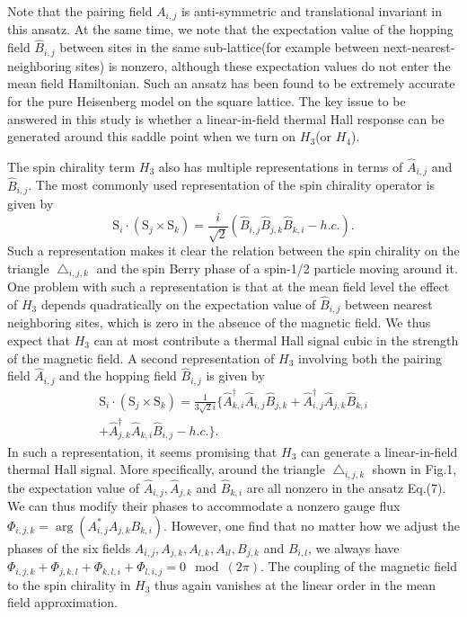 \documentclass[prb,twocolumn,showpacs]{revtex4}
\begin{document}
Note that the pairing field $A_{i,j}$ is anti-symmetric and translational invariant in this ansatz. At the same time, we note that the expectation value of the hopping field $\hat{B}_{i,j}$ between sites in the same sub-lattice(for example between next-nearest-neighboring sites) is nonzero, although these expectation values do not enter the mean field Hamiltonian. Such an ansatz has been found to be extremely accurate for the pure Heisenberg model on the square lattice. The key issue to be answered in this study is whether a linear-in-field thermal Hall response can be generated around this saddle point when we turn on $H_{3}$(or $H_{4}$).  

The spin chirality term $H_{3}$ also has multiple representations in terms of $\hat{A}_{i,j}$ and $\hat{B}_{i,j}$. The most commonly used representation of the spin chirality operator is given by\cite{Messio} 
\begin{equation}
\mathrm{S}_{i}\cdot (\mathrm{S}_{j}\times\mathrm{S}_{k})=\frac{i}{\sqrt{2}}(\hat{B}_{i,j}\hat{B}_{j,k}\hat{B}_{k,i}-h.c.).
\end{equation}
Such a representation makes it clear the relation between the spin chirality on the triangle $\bigtriangleup_{i,j,k}$ and the spin Berry phase of a spin-1/2 particle moving around it. One problem with such a representation is that at the mean field level the effect of $H_{3}$ depends quadratically on the expectation value of $\hat{B}_{i,j}$ between nearest neighboring sites, which is zero in the absence of the magnetic field. We thus expect that $H_{3}$ can at most contribute a thermal Hall signal cubic in the strength of the magnetic field. A second representation of $H_{3}$ involving both the pairing field $\hat{A}_{i,j}$ and the hopping field $\hat{B}_{i,j}$ is given by
\begin{eqnarray}
\mathrm{S}_{i}\cdot (\mathrm{S}_{j}\times\mathrm{S}_{k})=\frac{1}{3\sqrt{2}i} \{\hat{A}^{\dagger}_{k,i}\hat{A}_{i,j}\hat{B}_{j,k}
+\hat{A}^{\dagger}_{i,j}\hat{A}_{j,k}\hat{B}_{k,i}\nonumber\\
+\hat{A}^{\dagger}_{j,k}\hat{A}_{k,i}\hat{B}_{i,j}-h.c.\}.
\end{eqnarray}  
In such a representation, it seems promising that $H_{3}$ can generate a linear-in-field thermal Hall signal. More specifically, around the triangle $\bigtriangleup_{i,j,k}$ shown in Fig.1, the expectation value of $\hat{A}_{i,j}, \hat{A}_{j,k}$ and $\hat{B}_{k,i}$ are all nonzero in the ansatz Eq.(7). We can thus modify their phases to accommodate a nonzero gauge flux $\Phi_{i,j,k}=\arg (A^{*}_{i,j}A_{j,k}B_{k,i})$. However, one find that no matter how we adjust the phases of the six fields  $A_{i,j}, A_{j,k}, A_{l,k}, A_{il}, B_{j,k}$ and $B_{i,l}$, we always have $\Phi_{i,j,k}+\Phi_{j,k,l}+\Phi_{k,l,i}+\Phi_{l,i,j}=0\mod(2\pi)$. The coupling of the magnetic field to the spin chirality in $H_{3}$ thus again vanishes at the linear order in the mean field approximation.
\end{document}
